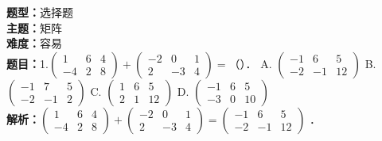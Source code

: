 \documentclass{ctexart}
\newenvironment{question}[5]{%
	\noindent\textbf{题型：}#1\\
	\textbf{主题：}#2\\
	\textbf{难度：}#3\\
	\textbf{题目：}#4\\
	\textbf{解析：}#5\\
	\vspace{1em}
}{}
\begin{document}
	
	\begin{question}
		{选择题}
		{矩阵}
		{容易}
		{1.\(\left(\begin{array}{ccc}1 & 6 & 4 \\ -4 & 2 & 8\end{array}\right)+\left(\begin{array}{ccc}-2 & 0 & 1 \\ 2 & -3 & 4\end{array}\right)=\)（）．
			A. \(\left(\begin{array}{ccc}-1 & 6 & 5 \\ -2 & -1 & 12\end{array}\right)\)
			B. \(\left(\begin{array}{ccc}-1 & 7 & 5 \\ -2 & -1 & 2\end{array}\right)\)
			C. \(\left(\begin{array}{ccc}1 & 6 & 5 \\ 2 & 1 & 12\end{array}\right)\)
			D. \(\left(\begin{array}{ccc}-1 & 6 & 5 \\ -3 & 0 & 10\end{array}\right)\)}
		{\(\left(\begin{array}{ccc}1 & 6 & 4 \\ -4 & 2 & 8\end{array}\right)+\left(\begin{array}{ccc}-2 & 0 & 1 \\ 2 & -3 & 4\end{array}\right)=\left(\begin{array}{ccc}-1 & 6 & 5 \\ -2 & -1 & 12\end{array}\right)\) ．}
	\end{question}
	
\end{document}
